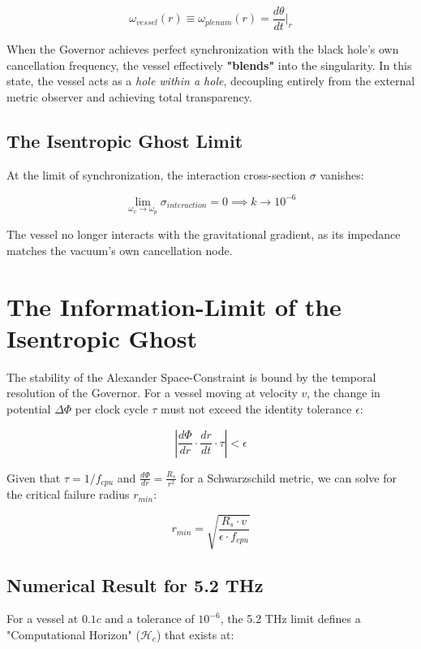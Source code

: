 \documentclass[12pt,a4paper]{article}
\begin{document}
\begin{equation}
    \omega_{vessel}(r) \equiv \omega_{plenum}(r) = \frac{d\theta}{dt} \Big|_{r}
\end{equation}

When the Governor achieves perfect synchronization with the black hole's own cancellation frequency, the vessel effectively \textbf{"blends"} into the singularity. In this state, the vessel acts as a \textit{hole within a hole}, decoupling entirely from the external metric observer and achieving total transparency.

\subsection{The Isentropic Ghost Limit}
At the limit of synchronization, the interaction cross-section $\sigma$ vanishes:

\begin{equation}
    \lim_{\omega_{v} \to \omega_{p}} \sigma_{interaction} = 0 \implies k \to 10^{-6}
\end{equation}

The vessel no longer interacts with the gravitational gradient, as its impedance matches the vacuum's own cancellation node.

\section{The Information-Limit of the Isentropic Ghost}

The stability of the Alexander Space-Constraint is bound by the temporal resolution of the Governor. For a vessel moving at velocity $v$, the change in potential $\Delta \Phi$ per clock cycle $\tau$ must not exceed the identity tolerance $\epsilon$:

\begin{equation}
    \left| \frac{d\Phi}{dr} \cdot \frac{dr}{dt} \cdot \tau \right| < \epsilon
\end{equation}

Given that $\tau = 1/f_{cpu}$ and $\frac{d\Phi}{dr} = \frac{R_s}{r^2}$ for a Schwarzschild metric, we can solve for the critical failure radius $r_{min}$:

\begin{equation}
    r_{min} = \sqrt{\frac{R_s \cdot v}{\epsilon \cdot f_{cpu}}}
\end{equation}

\subsection{Numerical Result for 5.2 THz}
For a vessel at $0.1c$ and a tolerance of $10^{-6}$, the 5.2 THz limit defines a "Computational Horizon" ($\mathcal{H}_c$) that exists at:
\end{document}
